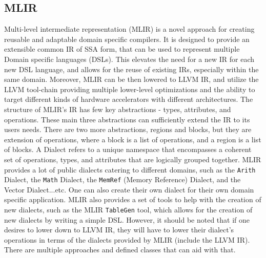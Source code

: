 \subsection{MLIR}
Multi-level intermediate representation (MLIR) is a novel approach for creating
reusable and adaptable domain specific compilers. It is designed to provide an
extensible common IR of SSA form, that can be used to represent multiple Domain
specific languages (DSLs). This elevates the need for a new IR for each new DSL
language, and allows for the reuse of existing IRs, especially within the same
domain. Moreover, MLIR can be then lowered to LLVM IR, and utilize the LLVM
tool-chain providing multiple lower-level optimizations and the ability to target
different kinds of hardware accelerators with different architectures. The
structure of MLIR's IR has few key abstractions - types, attributes, and
operations. These main three abstractions can sufficiently extend the IR to its
users needs. There are two more abstractions, regions and blocks, but they are
extension of operations, where a block is a list of operations, and a region is
a list of blocks. A Dialect refers to a unique namespace that encompasses a
coherent set of operations, types, and attributes that are logically grouped
together. MLIR provides a lot of public dialects catering to different domains,
such as the \texttt{Arith} Dialect, the \texttt{Math} Dialect, the \texttt{MemRef} (Memory Reference) Dialect,
and the Vector Dialect...etc. One can also create their own dialect 
for their own domain specific application. MLIR also provides a set of tools to
help with the creation of new dialects, such as the MLIR \texttt{TableGen} tool, which
allows for the creation of new dialects by writing a simple DSL.
However, it should be noted that if one desires to lower down to LLVM IR, they
will have to lower their dialect's operations in terms of the dialects provided 
by MLIR (include the LLVM IR). There are multiple approaches and defined classes that can aid with that.

